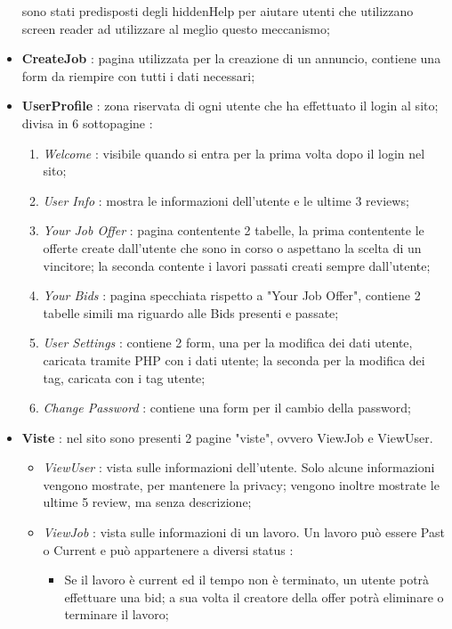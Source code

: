 \begin{itemize}
    sono stati predisposti degli hiddenHelp per aiutare utenti che utilizzano screen reader ad utilizzare al meglio questo meccanismo;
    \item \textbf{CreateJob} : pagina utilizzata per la creazione di un annuncio, contiene una form da riempire con tutti i dati necessari;
    \item \textbf{UserProfile} : zona riservata di ogni utente che ha effettuato il login al sito; divisa in 6 sottopagine :
    \begin{enumerate}
      \item \textit{Welcome} : visibile quando si entra per la prima volta dopo il login nel sito;
      \item \textit{User Info} : mostra le informazioni dell'utente e le ultime 3 reviews;
      \item \textit{Your Job Offer} : pagina contentente 2 tabelle, la prima contentente le offerte create dall'utente che sono in corso o aspettano la scelta di un vincitore; la seconda contente i lavori passati creati sempre dall'utente;
      \item \textit{Your Bids} : pagina specchiata rispetto a "Your Job Offer", contiene 2 tabelle simili ma riguardo alle Bids presenti e passate;
      \item \textit{User Settings} : contiene 2 form, una per la modifica dei dati utente, caricata tramite PHP con i dati utente; la seconda per la modifica dei tag, caricata con i tag utente;
      \item \textit{Change Password} : contiene una form per il cambio della password;
    \end{enumerate}
    \item \textbf{Viste} : nel sito sono presenti 2 pagine "viste", ovvero ViewJob e ViewUser.
    \begin{itemize}
      \item \textit{ViewUser} : vista sulle informazioni dell'utente. Solo alcune informazioni vengono mostrate, per mantenere la privacy; vengono inoltre mostrate le ultime 5 review, ma senza descrizione;
      \item \textit{ViewJob} : vista sulle informazioni di un lavoro. Un lavoro può essere Past o Current e può appartenere a diversi status :
      \begin{itemize}
        \item Se il lavoro è current ed il tempo non è terminato, un utente potrà effettuare una bid; a sua volta il creatore della offer potrà eliminare o terminare il lavoro;

\end{itemize}
\end{itemize}
\end{itemize}

